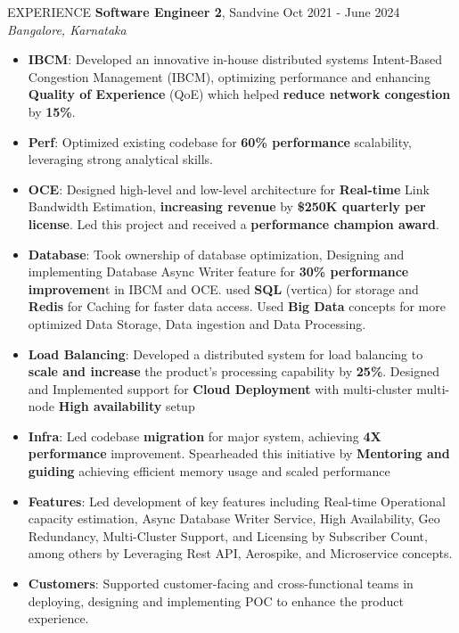 \documentclass{resume} %
\begin{document}
\begin{rSection}{EXPERIENCE}
\textbf{Software Engineer 2}, Sandvine \hfill Oct 2021 - June 2024\\
 \hfill \textit{Bangalore, Karnataka}
 \begin{itemize}
    \itemsep -6pt 
     \item \textbf{IBCM}:  Developed an innovative in-house distributed systems Intent-Based Congestion Management (IBCM), optimizing performance and enhancing \textbf{Quality of Experience} (QoE) which helped \textbf{reduce network congestion} by\textbf{ 15\%}.
    \item \textbf{Perf}: Optimized existing codebase for \textbf{60\% performance} scalability, leveraging strong analytical skills.
    \item \textbf{OCE}: Designed high-level and low-level architecture for \textbf{Real-time} Link Bandwidth Estimation, \textbf{increasing revenue} by \textbf{\$250K quarterly per license}. Led this project and received a \textbf{performance champion award}. 
    \item \textbf{Database}: Took ownership of database optimization, Designing and implementing Database Async Writer feature for \textbf{30\% performance improvemen}t in IBCM and OCE. used \textbf{SQL} (vertica) for storage and \textbf{Redis} for Caching for faster data access. Used \textbf{Big Data} concepts for more optimized Data Storage, Data ingestion and Data Processing. 
    \item \textbf{Load Balancing}: Developed a distributed system for load balancing to \textbf{scale and increase} the product's processing capability by\textbf{ 25\%}. Designed and Implemented support for \textbf{Cloud Deployment}  with multi-cluster multi-node \textbf{High availability} setup
    \item \textbf{Infra}: Led codebase \textbf{migration} for major system, achieving \textbf{4X performance} improvement. Spearheaded this initiative by \textbf{Mentoring and guiding} achieving efficient memory usage and scaled performance
    \item \textbf{Features}: Led development of key features including Real-time Operational capacity  estimation, Async Database Writer Service,  High Availability, Geo Redundancy, Multi-Cluster Support, and Licensing by Subscriber Count, among others by Leveraging Rest API, Aerospike, and Microservice concepts. 
    \item \textbf{Customers}: Supported customer-facing and cross-functional teams in deploying, designing  and implementing POC  to enhance the product experience.


\end{itemize}
\end{rSection}
\end{document}

